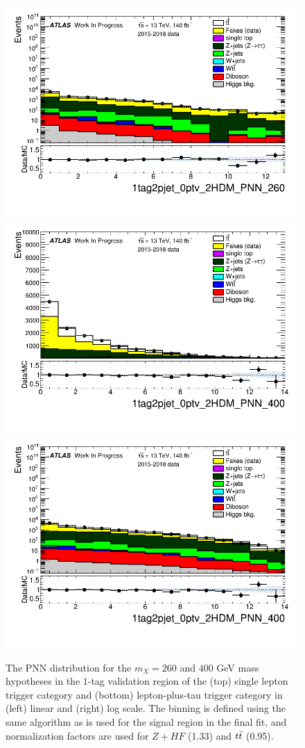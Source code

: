 \begin{figure}
\includegraphics[width=.45\textwidth]{DiHiggs/plots/lephadFF/LTT/1tag2pjet_0ptv_2HDM_PNN_260_LTT_ALLFAKES_Bulb_noNeg_log.png}\\
\includegraphics[width=.45\textwidth]{DiHiggs/plots/lephadFF/LTT/1tag2pjet_0ptv_2HDM_PNN_400_LTT_ALLFAKES_Bulb_noNeg_lin.png}
\includegraphics[width=.45\textwidth]{DiHiggs/plots/lephadFF/LTT/1tag2pjet_0ptv_2HDM_PNN_400_LTT_ALLFAKES_Bulb_noNeg_log.png}\\
\caption{The PNN distribution for the $m_{X} = 260$ and $400$ GeV mass hypotheses in the $1$-tag validation region of the (top) single lepton trigger category and (bottom) lepton-plus-tau trigger category in (left) linear and (right) log scale. The binning is defined using the same algorithm as is used for the signal region in the final fit, and normalization factors are used for $Z+HF$ (1.33) and $t\bar{t}$ (0.95).}
\label{fig:SLT_LTT_1tag}
\end{figure}

